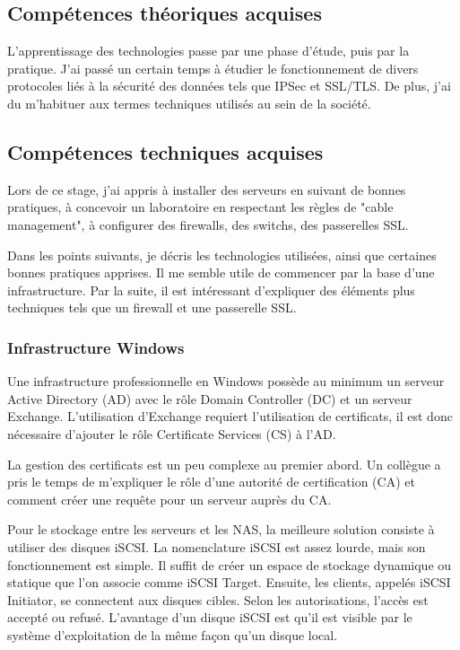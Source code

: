 \subsection{Compétences théoriques acquises}
L'apprentissage des technologies passe par une phase d'étude, puis par la pratique.
J'ai passé un certain temps à étudier le fonctionnement de divers protocoles liés à la sécurité des données tels que IPSec et SSL/TLS.
De plus, j'ai du m'habituer aux termes techniques utilisés au sein de la société.

\subsection{Compétences techniques acquises}
Lors de ce stage, j'ai appris à installer des serveurs en suivant de bonnes pratiques, à concevoir un laboratoire en respectant les règles de "cable management", à configurer des firewalls, des switchs, des passerelles SSL. 

Dans les points suivants, je décris les technologies utilisées, ainsi que certaines bonnes pratiques apprises.
Il me semble utile de commencer par la base d'une infrastructure.
Par la suite, il est intéressant d'expliquer des éléments plus techniques tels que un firewall et une passerelle SSL. 
\subsubsection{Infrastructure Windows}
Une infrastructure professionnelle en Windows possède au minimum un serveur Active Directory (AD) avec le rôle Domain Controller (DC) et un serveur Exchange. 
L'utilisation d'Exchange requiert l'utilisation de certificats, il est donc nécessaire d'ajouter le rôle Certificate Services (CS) à l'AD.

La gestion des certificats est un peu complexe au premier abord.
Un collègue a pris le temps de m'expliquer le rôle d'une autorité de certification (CA) et comment créer une requête pour un serveur auprès du CA. 

Pour le stockage entre les serveurs et les NAS, la meilleure solution consiste à utiliser des disques iSCSI.
La nomenclature iSCSI est assez lourde, mais son fonctionnement est simple. 
Il suffit de créer un espace de stockage dynamique ou statique que l'on associe comme iSCSI Target. 
Ensuite, les clients, appelés iSCSI Initiator, se connectent aux disques cibles. 
Selon les autorisations, l'accès est accepté ou refusé.
L'avantage d'un disque iSCSI est qu'il est visible par le système d'exploitation de la même façon qu'un disque local. 

